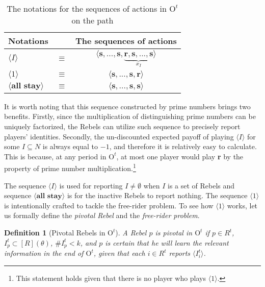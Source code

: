 \documentclass[12pt,letter]{article}
\newcommand{\Omicron}{\mathrm{O}}
\newtheorem{definition}{Definition}[section]
\theoremstyle{definition}
\theoremstyle{remark}
\theoremstyle{claim}
\begin{document}
\begin{table}[!htbp]
\caption{The notations for the sequences of actions in $\Omicron^t$ on the path}
\label{Table_msg_form}
\begin{center}
\begin{tabular}{l c c}
Notations && The sequences of actions\\
\hline
\hline
$\langle  I \rangle$ 				& $\equiv$ 			& $\langle \textbf{s},...,\textbf{s},\underbrace{\textbf{r},\textbf{s},...,\textbf{s}}_{x_{I}} \rangle$  \\
$\langle 1 \rangle$	 					& $\equiv$ 			& $\langle \textbf{s},...,\textbf{s},{\textbf{r}}\rangle$  \\
$\langle \textbf{all stay} \rangle$	 					& $\equiv$ 			& $\langle \textbf{s},...,\textbf{s},{\textbf{s}}\rangle$  \\
\hline
\end{tabular}
\end{center}
\end{table}


It is worth noting that this sequence constructed by prime numbers brings two benefits. Firstly, since the multiplication of distinguishing prime numbers can be uniquely factorized, the Rebels can utilize such sequence to precisely report players' identities. Secondly, the un-discounted expected payoff of playing $\langle I \rangle$ for some $I\subseteq N$ is always equal to $-1$, and therefore it is relatively easy to calculate. This is because, at any period in $\Omicron^{t}$, at most one player would play \textbf{r} by the property of prime number multiplication.\footnote{This statement holds given that there is no player who plays $\langle 1 \rangle$.} 

The sequence $\langle I \rangle$ is used for reporting $I\neq \emptyset$ when $I$ is a set of Rebels and sequence $\langle \textbf{all stay} \rangle$ is for the inactive Rebels to report nothing. The sequence $\langle 1 \rangle$ is intentionally crafted to tackle the free-rider problem. To see how $\langle 1 \rangle$ works, let us formally define the \textit{pivotal Rebel} and the \textit{free-rider problem}. 
\begin{definition}[Pivotal Rebels in $\Omicron^t$]
A Rebel $p$ is pivotal in $\Omicron^t$ if $p\in R^t$, $I^t_p\subset [R](\theta)$, $\# I^t_p<k$, and $p$ is certain that he will learn the relevant information in the end of $\Omicron^t$, given that each $i\in R^t$ reports $\langle I^t_i \rangle$.
\end{definition}
\end{document}
